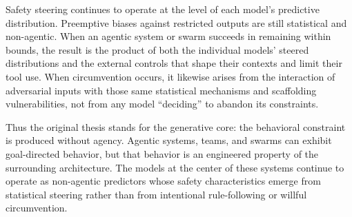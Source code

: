 Safety steering continues to operate at the level of each model’s predictive distribution. Preemptive biases against restricted outputs are still statistical and non-agentic. When an agentic system or swarm succeeds in remaining within bounds, the result is the product of both the individual models’ steered distributions and the external controls that shape their contexts and limit their tool use. When circumvention occurs, it likewise arises from the interaction of adversarial inputs with those same statistical mechanisms and scaffolding vulnerabilities, not from any model “deciding” to abandon its constraints.

Thus the original thesis stands for the generative core: the behavioral constraint is produced without agency. Agentic systems, teams, and swarms can exhibit goal-directed behavior, but that behavior is an engineered property of the surrounding architecture. The models at the center of these systems continue to operate as non-agentic predictors whose safety characteristics emerge from statistical steering rather than from intentional rule-following or willful circumvention.
